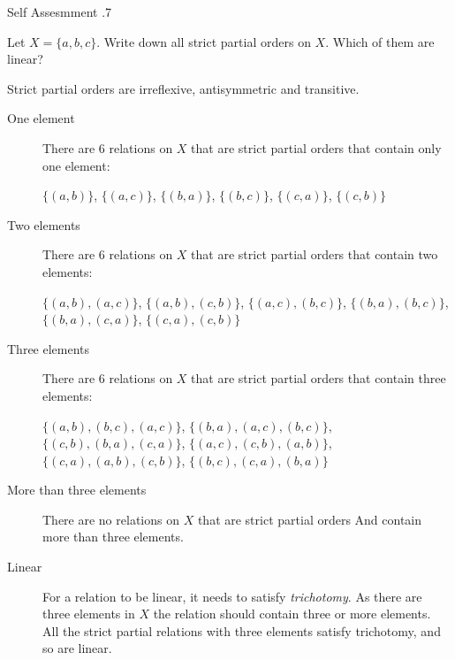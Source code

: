 \documentclass[\main/notes.tex]{subfiles}
\begin{document}
				\begin{exercise}{Self Assesmment \thechapter.7}
					\begin{questions}
						\item Let $X = \{a, b, c\}$. Write down all strict partial orders on $X$. Which of them are linear?
							\begin{answer}
								Strict partial orders are irreflexive, antisymmetric and transitive.
								\begin{description}
									\item[One element] There are $6$ relations on $X$ that are strict partial orders that contain only one element:
										\begin{center}
											$ \bigl\{(a, b)\bigr\}$, $\bigl\{(a, c)\bigr\}$, $\bigl\{(b, a)\bigr\}$, $\bigl\{(b, c)\bigr\}$, $\bigl\{(c, a)\bigr\}$, $\bigl\{(c, b)\bigr\}$
										\end{center}
									\item[Two elements] There are $6$ relations on $X$ that are strict partial orders that contain two elements:
										\begin{center}
											$ \bigl\{(a, b), (a, c)\bigr\}$, $ \bigl\{(a, b), (c, b)\bigr\}$, $ \bigl\{(a, c), (b, c)\bigr\}$, $ \bigl\{(b, a), (b, c)\bigr\}$, $ \bigl\{(b, a), (c, a)\bigr\}$, $\bigl\{(c, a), (c, b)\bigr\}$
										\end{center}
									\tcbbreak
									\item[Three elements] There are $6$ relations on $X$ that are strict partial orders that contain three elements:
										\begin{center}
											$\bigl\{(a, b), (b, c), (a, c)\bigr\}$, $\bigl\{(b, a), (a, c), (b, c)\bigr\}$, $\bigl\{(c, b), (b, a), (c, a)\bigr\}$, $\bigl\{(a, c), (c, b), (a, b)\bigr\}$, $\bigl\{(c, a), (a, b), (c, b)\bigr\}$, $\bigl\{(b, c), (c, a), (b, a)\bigr\}$
										\end{center}
									\item[More than three elements] There are no relations on $X$ that are strict partial orders And contain more than three elements.
									\item[Linear] For a relation to be linear, it needs to satisfy \emph{trichotomy}. As there are three elements in $X$ the relation should contain three or more elements.\\
										All the strict partial relations with three elements satisfy trichotomy, and so are linear. 
								\end{description}

\end{answer}
\end{questions}
\end{exercise}
\end{document}
